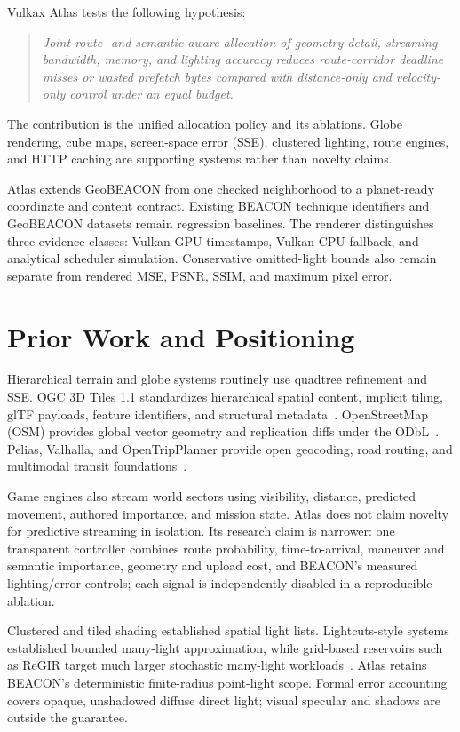 \documentclass[12pt]{article}
\begin{document}
Vulkax Atlas tests the following hypothesis:
\begin{quote}
\emph{Joint route- and semantic-aware allocation of geometry detail, streaming bandwidth, memory,
and lighting accuracy reduces route-corridor deadline misses or wasted prefetch bytes compared with
distance-only and velocity-only control under an equal budget.}
\end{quote}
The contribution is the unified allocation policy and its ablations. Globe rendering, cube maps,
screen-space error (SSE), clustered lighting, route engines, and HTTP caching are supporting
systems rather than novelty claims.

Atlas extends GeoBEACON from one checked neighborhood to a planet-ready coordinate and content
contract. Existing BEACON technique identifiers and GeoBEACON datasets remain regression baselines.
The renderer distinguishes three evidence classes: Vulkan GPU timestamps, Vulkan CPU fallback, and
analytical scheduler simulation. Conservative omitted-light bounds also remain separate from
rendered MSE, PSNR, SSIM, and maximum pixel error.

\section{Prior Work and Positioning}
Hierarchical terrain and globe systems routinely use quadtree refinement and SSE. OGC 3D Tiles 1.1
standardizes hierarchical spatial content, implicit tiling, glTF payloads, feature identifiers, and
structural metadata~\cite{tiles}. OpenStreetMap (OSM) provides global vector geometry and replication
diffs under the ODbL~\cite{osm,replication}. Pelias, Valhalla, and OpenTripPlanner provide open
geocoding, road routing, and multimodal transit foundations~\cite{pelias,valhalla,otp}.

Game engines also stream world sectors using visibility, distance, predicted movement, authored
importance, and mission state. Atlas does not claim novelty for predictive streaming in isolation.
Its research claim is narrower: one transparent controller combines route probability,
time-to-arrival, maneuver and semantic importance, geometry and upload cost, and BEACON's measured
lighting/error controls; each signal is independently disabled in a reproducible ablation.

Clustered and tiled shading established spatial light lists. Lightcuts-style systems established
bounded many-light approximation, while grid-based reservoirs such as ReGIR target much larger
stochastic many-light workloads~\cite{regir}. Atlas retains BEACON's deterministic finite-radius
point-light scope. Formal error accounting covers opaque, unshadowed diffuse direct light; visual
specular and shadows are outside the guarantee.
\end{document}
